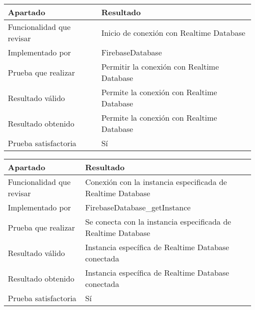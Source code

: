 \bigskip

\begin{center}
    \begin{tabulary}{0.8\textwidth}{L|L}
        \textbf{Apartado} & \textbf{Resultado} \\ \hline
        Funcionalidad que revisar & Inicio de conexión con Realtime Database \\
        Implementado por & FirebaseDatabase \\
        Prueba que realizar & Permitir la conexión con Realtime Database \\
        Resultado válido & Permite la conexión con Realtime Database \\
        Resultado obtenido & Permite la conexión con Realtime Database \\
        Prueba satisfactoria & Sí \\
    \end{tabulary} 
\end{center}

\bigskip

\begin{center}
    \begin{tabulary}{0.8\textwidth}{L|L}
        \textbf{Apartado} & \textbf{Resultado} \\ \hline
        Funcionalidad que revisar & Conexión con la instancia especificada de Realtime Database \\
        Implementado por & FirebaseDatabase\_getInstance \\
        Prueba que realizar & Se conecta con la instancia especificada de Realtime Database \\
        Resultado válido & Instancia específica de Realtime Database conectada \\
        Resultado obtenido & Instancia específica de Realtime Database conectada \\
        Prueba satisfactoria & Sí \\
    \end{tabulary} 
\end{center}

\bigskip

